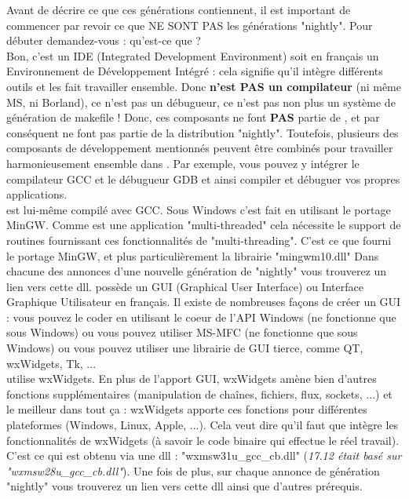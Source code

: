 Avant de décrire ce que ces générations contiennent, il est important de commencer par revoir ce que NE SONT PAS les générations "nightly". Pour débuter demandez-vous : qu'est-ce que \codeblocks ?\\
Bon, c'est un IDE (Integrated Development Environment) soit en français un Environnement de Développement Intégré : cela signifie qu'il intègre différents outils et les fait travailler ensemble. Donc \codeblocks \textbf{n'est PAS un compilateur} (ni même MS, ni Borland), ce n'est pas un débugueur, ce n'est pas non plus un système de génération de makefile ! Donc, ces composants ne font \textbf{PAS} partie de \codeblocks, et par conséquent ne font pas partie de la distribution "nightly". Toutefois, plusieurs des composants de développement mentionnés peuvent être combinés pour travailler harmonieusement ensemble dans \codeblocks. Par exemple, vous pouvez y intégrer le compilateur GCC et le débugueur GDB et ainsi compiler et débuguer vos propres applications.\\
\codeblocks est lui-même compilé avec GCC. Sous Windows c'est fait en utilisant le portage MinGW. Comme \codeblocks est une application "multi-threaded" cela nécessite le support de routines fournissant ces fonctionnalités de "multi-threading". C'est ce que fourni le portage MinGW, et plus particulièrement la librairie "mingwm10.dll" Dans chacune des annonces d'une nouvelle génération de "nightly" vous trouverez un lien vers cette dll.
\codeblocks possède un GUI (Graphical User Interface) ou Interface Graphique Utilisateur en français. Il existe de nombreuses façons de créer un GUI : vous pouvez le coder en utilisant le coeur de l'API Windows (ne fonctionne que sous Windows) ou vous pouvez utiliser MS-MFC (ne fonctionne que sous Windows) ou vous pouvez utiliser une librairie de GUI tierce, comme QT, wxWidgets, Tk, ...\\
\codeblocks utilise wxWidgets. En plus de l'apport GUI, wxWidgets amène bien d'autres fonctions supplémentaires (manipulation de chaînes, fichiers, flux, sockets, ...) et le meilleur dans tout ça : wxWidgets apporte ces fonctions pour différentes plateformes (Windows, Linux, Apple, ...). Cela veut dire qu'il faut que \codeblocks intègre les fonctionnalités de wxWidgets (à savoir le code binaire qui effectue le réel travail). C'est ce qui est obtenu via une dll : "wxmsw31u\_gcc\_cb.dll" (\textit{17.12 était basé sur "wxmsw28u\_gcc\_cb.dll"}). Une fois de plus, sur chaque annonce de génération "nightly" vous trouverez un lien vers cette dll ainsi que d'autres prérequis.

